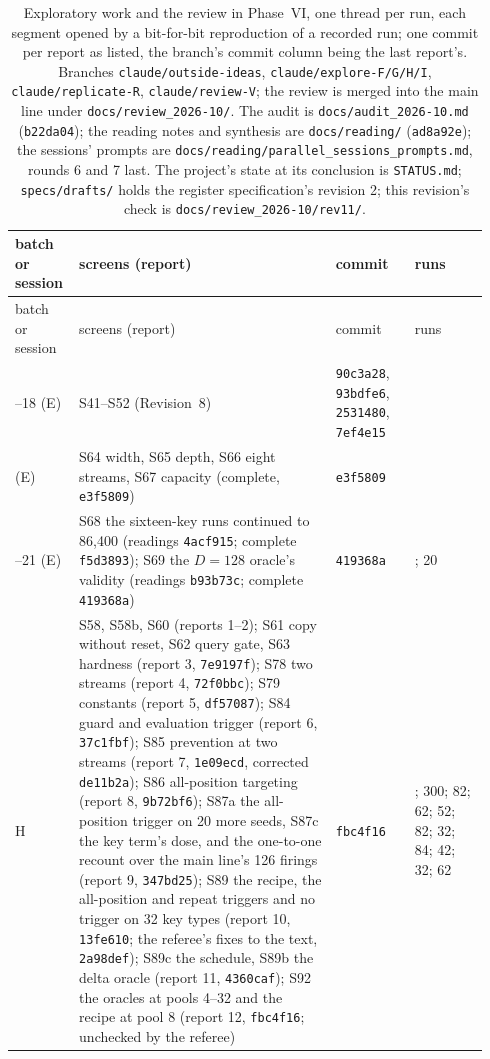 \documentclass[11pt]{article}
\begin{document}
{\footnotesize
\setlength{\tabcolsep}{3pt}
\begin{longtable}{@{}>{\raggedright\arraybackslash}p{0.11\linewidth}>{\raggedright\arraybackslash}p{0.52\linewidth}>{\raggedright\arraybackslash}p{0.16\linewidth}>{\raggedright\arraybackslash}p{0.15\linewidth}@{}}
\caption{Exploratory work and the review in Phase~VI, one thread per run, each segment opened by a bit-for-bit reproduction of a recorded run; one commit per report as listed, the branch's commit column being the last report's. Branches \texttt{claude/outside-ideas}, \texttt{claude/explore-F/G/H/I}, \texttt{claude/replicate-R}, \texttt{claude/review-V}; the review is merged into the main line under \texttt{docs/review\_2026-10/}. The audit is \texttt{docs/audit\_2026-10.md} (\texttt{b22da04}); the reading notes and synthesis are \texttt{docs/reading/} (\texttt{ad8a92e}); the sessions' prompts are \texttt{docs/reading/parallel\_sessions\_prompts.md}, rounds 6 and 7 last. The project's state at its conclusion is \texttt{STATUS.md}; \texttt{specs/drafts/} holds the register specification's revision 2; this revision's check is \texttt{docs/review\_2026-10/rev11/}.}
\label{tab:batches}\\
\toprule
batch or session & screens (report) & commit & runs\\
\midrule
\endfirsthead
\toprule
batch or session & screens (report) & commit & runs\\
\midrule
\endhead
15--18 (E) & S41--S52 (Revision~8) & \texttt{90c3a28}, \texttt{93bdfe6}, \texttt{2531480}, \texttt{7ef4e15} & 379\\
19 (E) & S64 width, S65 depth, S66 eight streams, S67 capacity (complete, \texttt{e3f5809}) & \texttt{e3f5809} & 186\\
20--21 (E) & S68 the sixteen-key runs continued to 86{,}400 (readings \texttt{4acf915}; complete \texttt{f5d3893}); S69 the $D = 128$ oracle's validity (readings \texttt{b93b73c}; complete \texttt{419368a}) & \texttt{419368a} & 19; 20\\
H & S58, S58b, S60 (reports 1--2); S61 copy without reset, S62 query gate, S63 hardness (report 3, \texttt{7e9197f}); S78 two streams (report 4, \texttt{72f0bbc}); S79 constants (report 5, \texttt{df57087}); S84 guard and evaluation trigger (report 6, \texttt{37c1fbf}); S85 prevention at two streams (report 7, \texttt{1e09ecd}, corrected \texttt{de11b2a}); S86 all-position targeting (report 8, \texttt{9b72bf6}); S87a the all-position trigger on 20 more seeds, S87c the key term's dose, and the one-to-one recount over the main line's 126 firings (report 9, \texttt{347bd25}); S89 the recipe, the all-position and repeat triggers and no trigger on 32 key types (report 10, \texttt{13fe610}; the referee's fixes to the text, \texttt{2a98def}); S89c the schedule, S89b the delta oracle (report 11, \texttt{4360caf}); S92 the oracles at pools 4--32 and the recipe at pool 8 (report 12, \texttt{fbc4f16}; unchecked by the referee) & \texttt{fbc4f16} & 318; 300; 82; 62; 52; 82; 32; 84; 42; 32; 62\\

\end{longtable}}
\end{document}

